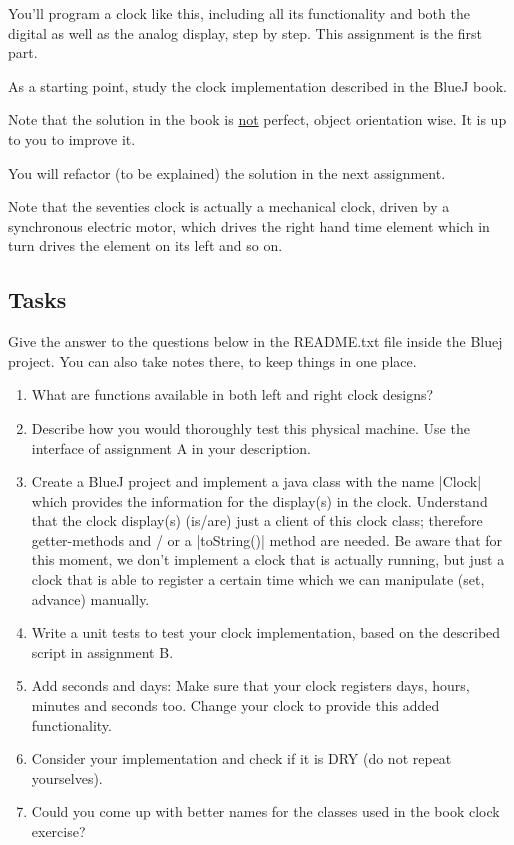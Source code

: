\begin{multicols}{2}
You’ll program a clock like this, including all its functionality and
both the digital as well as the analog display, step by step. This
assignment is the first part. {\color{red}As a starting point, study the clock
implementation described in the BlueJ book.

Note that the solution in the book is \underline{not} perfect, object orientation
wise. It is up to you to improve it.

You will refactor (to be explained) the solution in the next assignment.}
Note that the seventies clock is actually a mechanical clock, driven
by a synchronous electric motor, which drives the right hand time
element which in turn drives the element on  its left and so on.

\subsection*{Tasks}
Give the answer to the questions below in the README.txt file inside the Bluej project.
You can also take notes there, to keep things in one place.

\begin{enumerate}[label=\Alph*]
\item What are functions available in both left and right clock designs?
\item Describe how you would thoroughly test this physical
  machine. Use the interface of assignment A in your description.
\item Create a BlueJ project and implement a java class with the name
  |Clock| which provides the information for the display(s) in the
  clock. Understand that the clock display(s) (is/are) just a client of this
  clock class; therefore getter-methods
  and / or a |toString()| method are needed.
  Be aware that for this moment, we don’t implement a clock that is
  actually running, but just a clock that is able to register a
  certain time which we can manipulate (set, advance) manually.
\item Write a unit tests to test your clock implementation,
  based on the described script in assignment B.
\item Add seconds and days: Make sure that your clock registers days, hours,
  minutes and seconds too. Change your clock to provide this added
  functionality.
\item Consider your implementation and check if it is DRY (do not
  repeat yourselves).
\item Could you come up with better names for the classes used in the
  book clock exercise?
\end{enumerate}
\end{multicols}


